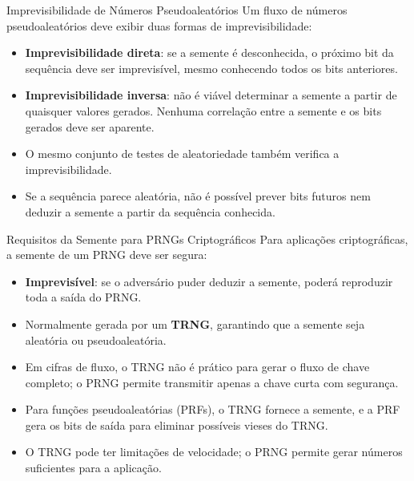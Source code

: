 \begin{frame}{Imprevisibilidade de Números Pseudoaleatórios}
Um fluxo de números pseudoaleatórios deve exibir duas formas de imprevisibilidade:

\begin{itemize}
    \item \textbf{Imprevisibilidade direta}: se a semente é desconhecida, o próximo bit da sequência deve ser imprevisível, mesmo conhecendo todos os bits anteriores.
    \item \textbf{Imprevisibilidade inversa}: não é viável determinar a semente a partir de quaisquer valores gerados. Nenhuma correlação entre a semente e os bits gerados deve ser aparente.
\end{itemize}

\medskip

\begin{itemize}
    \item O mesmo conjunto de testes de aleatoriedade também verifica a imprevisibilidade.
    \item Se a sequência parece aleatória, não é possível prever bits futuros nem deduzir a semente a partir da sequência conhecida.
\end{itemize}
\end{frame}

\begin{frame}{Requisitos da Semente para PRNGs Criptográficos}
Para aplicações criptográficas, a semente de um PRNG deve ser segura:

\begin{itemize}
    \item \textbf{Imprevisível}: se o adversário puder deduzir a semente, poderá reproduzir toda a saída do PRNG.
    \item Normalmente gerada por um \textbf{TRNG}, garantindo que a semente seja aleatória ou pseudoaleatória.
\end{itemize}

\medskip

\begin{itemize}
    \item Em cifras de fluxo, o TRNG não é prático para gerar o fluxo de chave completo; o PRNG permite transmitir apenas a chave curta com segurança.
    \item Para funções pseudoaleatórias (PRFs), o TRNG fornece a semente, e a PRF gera os bits de saída para eliminar possíveis vieses do TRNG.
    \item O TRNG pode ter limitações de velocidade; o PRNG permite gerar números suficientes para a aplicação.
\end{itemize}
\end{frame}

